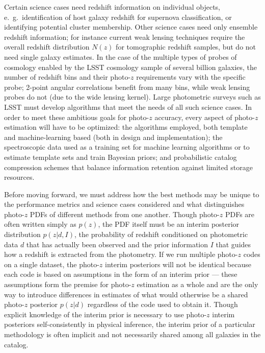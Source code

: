 Certain science cases need redshift information on individual objects, e.~g.~identification of host galaxy redshift for supernova classification, or identifying potential cluster membership.
Other science cases need only ensemble redshift information; for instance current weak lensing techniques require the overall redshift distribution $N(z)$ for tomographic redshift samples, but do not need single galaxy estimates.
In the case of the multiple types of probes of cosmology enabled by the
LSST cosmology sample of several billion galaxies, the number of redshift bins and their photo-$z$ requirements vary with the specific probe;  2-point angular correlations benefit from many bins, while weak lensing probes do not (due to the wide lensing kernel).
Large photometric surveys such as LSST must develop algorithms that meet the needs of all such science cases.
In order to meet these ambitious goals for photo-$z$ accuracy, every aspect of photo-$z$ estimation will have to be optimized: the algorithms employed, both template and machine-learning based (both in design and implementation); the spectroscopic data used as a training set for machine learning algorithms or to estimate template sets and train Bayesian priors; and probabilistic catalog compression schemes that balance information retention against limited storage resources.

Before moving forward, we must address how the best methods may be unique to the performance metrics and science cases considered and what distinguishes photo-$z$ PDFs of different methods from one another.
Though photo-$z$ PDFs are often written simply as $p(z)$, the PDF itself must be an interim posterior distribution $p(z | d, I)$, the probability of redshift conditioned on photometric data $d$ that has actually been observed and the prior information $I$ that guides how a redshift is extracted from the photometry.
If we run multiple photo-$z$ codes on a single dataset, the photo-$z$ interim posteriors will not be identical because each code is based on assumptions in the form of an interim prior --- these assumptions form the premise for photo-$z$ estimation as a whole and are the only way to introduce differences in estimates of what would otherwise be a shared photo-$z$ posterior $p(z | d)$ regardless of the code used to obtain it.
Though explicit knowledge of the interim prior is necessary to use photo-$z$ interim posteriors self-consistently in physical inference, the interim prior of a particular methodology is often implicit and not necessarily shared among all galaxies in the catalog.

